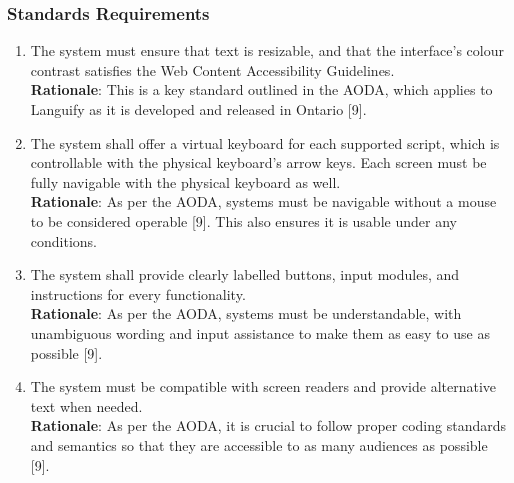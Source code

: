 \subsubsection{Standards Requirements}
\label{ssub:standards_requirements}
\begin{enumerate}[{LR-STD}1. ]
	\item The system must ensure that text is resizable, and that the interface’s colour contrast satisfies the Web Content Accessibility Guidelines.
	\\ \textbf{Rationale}: This is a key standard outlined in the AODA, which applies to Languify as it is developed and released in Ontario [9].
	\item The system shall offer a virtual keyboard for each supported script, which is controllable with the physical keyboard’s arrow keys. Each screen must be fully navigable with the physical keyboard as well.
	\\ \textbf{Rationale}: As per the AODA, systems must be navigable without a mouse to be considered operable [9]. This also ensures it is usable under any conditions.
	\item The system shall provide clearly labelled buttons, input modules, and instructions for every functionality.
	\\ \textbf{Rationale}: As per the AODA, systems must be understandable, with unambiguous wording and input assistance to make them as easy to use as possible [9].
	\item The system must be compatible with screen readers and provide alternative text when needed.
	\\ \textbf{Rationale}: As per the AODA, it is crucial to follow proper coding standards and semantics so that they are accessible to as many audiences as possible [9].
\end{enumerate}



